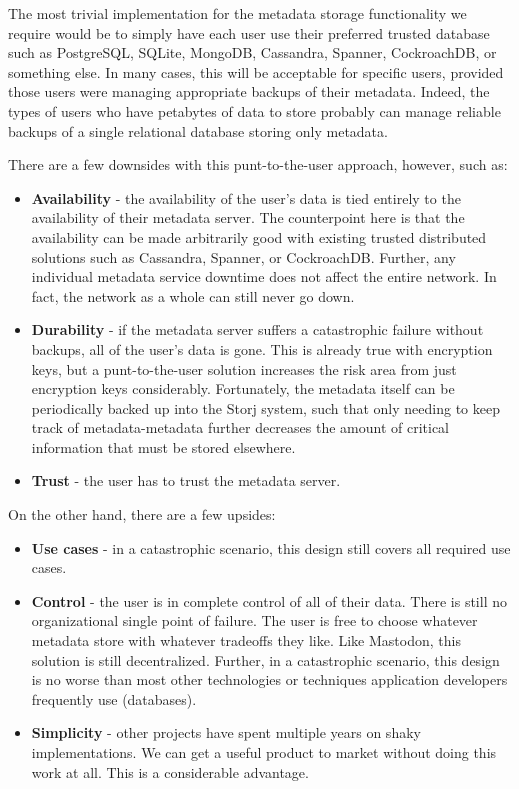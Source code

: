 \documentclass[a4paper,10pt]{article} \usepackage[utf8]{inputenc}
\begin{document}
The most trivial implementation for the metadata storage functionality we
require would be to simply have each user use their preferred trusted database
such as PostgreSQL, SQLite, MongoDB, Cassandra\cite{cassandra},
Spanner\cite{spanner}, CockroachDB, or something else. In many cases, this will
be acceptable for specific users, provided those users were managing appropriate
backups of their metadata. Indeed, the types of users who have petabytes of data
to store probably can manage reliable backups of a single relational database
storing only metadata.

There are a few downsides with this punt-to-the-user approach, however, such as:
\begin{itemize}
\item {\bf Availability} - the availability of the user's data
is tied entirely to the availability of their metadata server. The counterpoint
here is that the availability can be made arbitrarily good with existing trusted
distributed solutions such as Cassandra, Spanner, or CockroachDB. Further, any
individual metadata service downtime does not affect the entire network. In
fact, the network as a whole can still never go down.
\item {\bf Durability} -
if the metadata server suffers a catastrophic failure without backups, all of
the user's data is gone. This is already true with encryption keys, but a
punt-to-the-user solution increases the risk area from just encryption keys
considerably. Fortunately, the metadata itself can be periodically backed up
into the Storj system, such that only needing to keep track of metadata-metadata
further decreases the amount of critical information that must be stored
elsewhere.
\item {\bf Trust} - the user has to trust the metadata server.
\end{itemize}

On the other hand, there are a few upsides: \begin{itemize} \item {\bf Use
cases} - in a catastrophic scenario, this design still covers all required use
cases. \item {\bf Control} - the user is in complete control of all of their
data. There is still no organizational single point of failure. The user is free
to choose whatever metadata store with whatever tradeoffs they like. Like
Mastodon\cite{mastodon}, this solution is still decentralized. Further, in a
catastrophic scenario, this design is no worse than most other technologies or
techniques application developers frequently use (databases). \item {\bf
Simplicity} - other projects have spent multiple years on shaky implementations.
We can get a useful product to market without doing this work at all. This is a
considerable advantage. \end{itemize}
\end{document}
